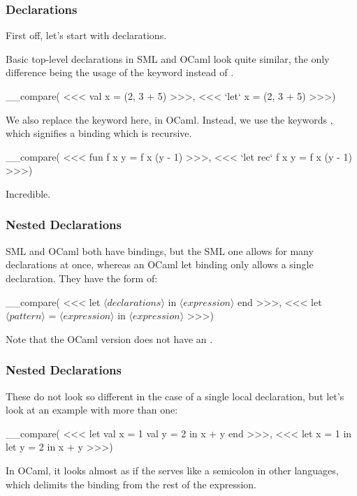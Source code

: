 \documentclass[aspectratio=169, handout]{beamer}
\begin{document}
\begin{frame}[fragile]
  \frametitle{Declarations}

  First off, let's start with declarations.

  \vspace{\fill}

  Basic top-level declarations in SML and OCaml look quite similar, the only
  difference being the usage of the  keyword instead of .

  \vspace{\fill}

  __compare(
<<<
  val x = (2, 3 + 5)
>>>,
<<<
  `let` x = (2, 3 + 5)
>>>)

  \vspace{\fill}

  We also replace the  keyword here, in OCaml. Instead, we use the keywords
  , which signifies a  binding which is recursive.

  \vspace{\fill}

  __compare(
<<<
  fun f x y = f x (y - 1)
>>>,
<<<
  `let rec` f x y = f x (y - 1)
>>>)

  \vspace{\fill}

  Incredible.
\end{frame}

\begin{frame}[fragile]
  \frametitle{Nested Declarations}

  SML and OCaml both have  bindings, but the SML one allows for many
  declarations at once, whereas an OCaml let binding only allows a single
  declaration. They have the form of:

  \vspace{\fill}

__compare(
<<<
  let
    $\langle declarations\rangle$
  in
    $\langle expression\rangle$
  end
>>>,
<<<
  let $\langle pattern\rangle$ = $\langle expression\rangle$ in
  $\langle expression\rangle$
>>>)

  \vspace{\fill}

  Note that the OCaml version does not have an .
\end{frame}

\begin{frame}[fragile]
  \frametitle{Nested Declarations}

  These do not look so different in the case of a single local declaration,
  but let's look at an example with more than one:

  \vspace{\fill}

  __compare(
<<<
let
  val x = 1
  val y = 2
in
  x + y
end
>>>,
<<<
let x = 1 in
let y = 2 in
x + y
>>>)

  \vspace{\fill}

  In OCaml, it looks almost as if the  serves like a semicolon in other
  languages, which delimits the  binding from the rest of the
  expression.
\end{frame}
\end{document}
